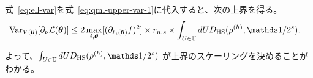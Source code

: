 式~\eqref{eq:ell-var}を式~\eqref{eq:qml-upper-var-1}に代入すると、次の上界を得る。
\begin{align}\label{eq:qml-upper-var-2}
    \Var_{V(\bs{\th})}[\pd_\nu \calL(\bs{\th})]
    &\leq
    2\max_{i,\bs{\th}} [(\pd_{\ell_i(\bs{\th})}f)^2]
    \times r_{n,s} \times
    \int_{U\in\bbU} dU D_{\HS} (\rho^{(h)} , \bbid/2^s ).
\end{align}

よって、$\int_{U\in\bbU} dU D_{\HS} (\rho^{(h)} , \bbid/2^s)$ が上界のスケーリングを決めることがわかる。

\begin{comment}
    \section{Connect two papers results}
    \cite{cerezo2021cost,thanasilp2021subtleties}When QNN is giben by a single layer of the alternating layered ansatz made of a tensor product of s-qubit unitaries and a local cost function is
    $$
        \ell_i(\bs{\th}) = 1 - \frac{1}{n}\sum_{j=1}^n \Tr[(\dyad{0}_j \ot \bbid_{\bar{j}} ) \rho_i(\bs{\th})] ,
    $$
    the $\Var_{V(\bs{\th})}[\pd_\nu\, \ell_i(\bs{\th})]$ is given by

    \begin{align}
        \Var_{V(\bs{\th})}[\pd_\nu\, \ell_i(\bs{\th})] = r_{n,s}\,D_{\HS}(\rho_i^{(h)},\, \bbid/2^s),\quad r_{n,s} = \frac{s\cdot 2^{3(s-1)}}{n^2(2^{2s}-1)^2} \in \Omega\qty(\frac{1}{\poly(n)}).
    \end{align}

    Using the inequality in \textbf{Theorem 2}, $\Var_{V(\bs{\th})}[\pd_\nu\, \ell_i(\bs{\th})]$ is bounded as follows.
    \begin{align}
        \frac{r_{n,s}}{d}\,D_2(\rho_i^{(h)},\, \bbid/2^s) \leq \Var_{V(\bs{\th})}[\pd_\nu\, \ell_i(\bs{\th})] \leq \frac{r_{n,s}}{e}\,D_2(\rho_i^{(h)},\, \bbid/2^s).
    \end{align}

    In a kind of circuits, $D_2(\rho,\, \bbid/2^s)$ is shown to be exponentially small with respect to the number of embedding layers~\cite{thanasilp2022exponential}.
    We have to note that the some assumptions are different in these two papers~\cite{thanasilp2022exponential,cerezo2021cost}. However, If we were able to show that $\bbV[\pd_\nu\, \ell_i(\bs{\th})]$ is given by the form of $r_{n,s}\,D_{\HS}(\rho_i,\, \bbid/2^s)$ and $D_2(\rho_i,\, \bbid/2^s) \in \Omega\qty(e^{-\alpha n})\, (\alpha>0)$ for the same conditions, it shows the effect of encoding on barren plateaus.
\end{comment}



